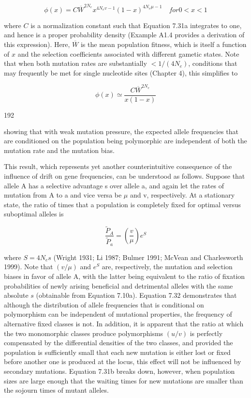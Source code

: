 \documentclass{article}
\begin{document}
\begin{equation}
\phi(x)=C\overline{W}^{2N_{e}}x^{4N_{e}v-1}\left(1-x\right)^{4N_{e}\mu-1}\quad for0<x<1
\tag{7.31a}
\label{eq:7_31a}
\end{equation}

where $C$ is a normalization constant such that Equation 7.31a integrates to one, and hence is a proper probability density (Example A1.4 provides a derivation of this expression). Here, $\overline{W}$ is the mean population fitness, which is itself a function of $x$ and the selection coefficients associated with different gametic states. Note that when both mutation rates are substantially $<1/(4N_e)$, conditions that may frequently be met for single nucleotide sites (Chapter 4), this simplifies to

\begin{equation}
\phi(x)\simeq\frac{C\overline{W}^{2N_{e}}}{x(1-x)}
\tag{7.31b}
\label{eq:7_31b}
\end{equation}

192

showing that with weak mutation pressure, the expected allele frequencies that are conditioned on the population being polymorphic are independent of both the mutation rate and the mutation bias.

This result, which represents yet another counterintuitive consequence of the influence of drift on gene frequencies, can be understood as follows. Suppose that allele A has a selective advantage s over allele a, and again let the rates of mutation from A to a and vice versa be  $ \mu $ and v, respectively. At a stationary state, the ratio of times that a population is completely fixed for optimal versus suboptimal alleles is

\begin{equation}
\frac{\widetilde{P}_{A}}{\widetilde{P}_{a}}=\left(\frac{v}{\mu}\right)e^{S}
\tag{7.32}
\label{eq:7_32}
\end{equation}

where  $ S = 4N_e s $ (Wright 1931; Li 1987; Bulmer 1991; McVean and Charlesworth 1999). Note that  $ (v/\mu) $ and  $ e^S $ are, respectively, the mutation and selection biases in favor of allele A, with the latter being equivalent to the ratio of fixation probabilities of newly arising beneficial and detrimental alleles with the same absolute  $ s $ (obtainable from Equation 7.10a). Equation 7.32 demonstrates that although the distribution of allele frequencies that is conditional on polymorphism can be independent of mutational properties, the frequency of alternative fixed classes is not. In addition, it is apparent that the ratio at which the two monomorphic classes produce polymorphisms  $ (u/v) $ is perfectly compensated by the differential densities of the two classes, and provided the population is sufficiently small that each new mutation is either lost or fixed before another one is produced at the locus, this effect will not be influenced by secondary mutations. Equation 7.31b breaks down, however, when population sizes are large enough that the waiting times for new mutations are smaller than the sojourn times of mutant alleles.
\end{document}
